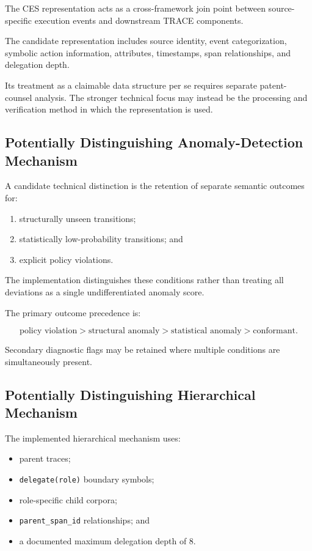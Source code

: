 \documentclass[11pt,a4paper]{article}
\begin{document}
The CES representation acts as a cross-framework join point between source-specific
execution events and downstream TRACE components.

The candidate representation includes source identity, event categorization, symbolic
action information, attributes, timestamps, span relationships, and delegation depth.

Its treatment as a claimable data structure per se requires separate patent-counsel
analysis. The stronger technical focus may instead be the processing and verification
method in which the representation is used.

\subsection{Potentially Distinguishing Anomaly-Detection Mechanism}

A candidate technical distinction is the retention of separate semantic outcomes for:

\begin{enumerate}[label=(\alph*)]
\item structurally unseen transitions;
\item statistically low-probability transitions; and
\item explicit policy violations.
\end{enumerate}

The implementation distinguishes these conditions rather than treating all deviations as
a single undifferentiated anomaly score.

The primary outcome precedence is:

\[
\text{policy violation}
>
\text{structural anomaly}
>
\text{statistical anomaly}
>
\text{conformant}.
\]

Secondary diagnostic flags may be retained where multiple conditions are simultaneously
present.

\subsection{Potentially Distinguishing Hierarchical Mechanism}

The implemented hierarchical mechanism uses:

\begin{itemize}
\item parent traces;
\item \texttt{delegate(role)} boundary symbols;
\item role-specific child corpora;
\item \texttt{parent\_span\_id} relationships; and
\item a documented maximum delegation depth of 8.
\end{itemize}
\end{document}
